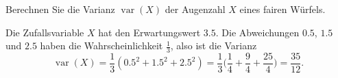 Berechnen Sie die Varianz $\operatorname{var}(X)$
der Augenzahl $X$ eines fairen Würfels.


\begin{loesung}
Die Zufallsvariable $X$ hat den Erwartungswert $3.5$. Die Abweichungen
$0.5$, $1.5$ und $2.5$ haben die Wahrscheinlichkeit $\frac13$, also ist
die Varianz
\[
\operatorname{var}(X)=\frac13(0.5^2+1.5^2+2.5^2)=\frac13\biggl(
\frac14+\frac94+\frac{25}{4}
\biggr)
=\frac{35}{12}.
\]
\end{loesung}

